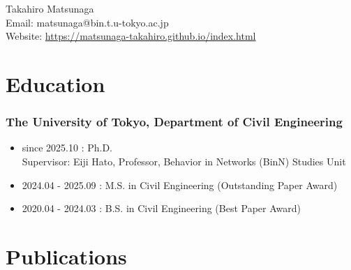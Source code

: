 \documentclass[uplatex,a4paper,10pt,dvipdfmx]{jsarticle}
\begin{document}
\begin{center}
  {\LARGE Takahiro Matsunaga}\\[2mm] %
  \small Email: {matsunaga@bin.t.u-tokyo.ac.jp} \\ Website: \url{https://matsunaga-takahiro.github.io/index.html}
\end{center}

\section*{Education}
\subsubsection*{The University of Tokyo, Department of Civil Engineering}
\begin{itemize}
  \item since 2025.10 : Ph.D. \\
        Supervisor: Eiji Hato, Professor, Behavior in Networks (BinN) Studies Unit
  \item 2024.04 - 2025.09 : M.S. in Civil Engineering (Outstanding Paper Award)
  \item 2020.04 - 2024.03 : B.S. in Civil Engineering (Best Paper Award)

\end{itemize}


\section*{Publications}

\nocite{*}



\end{document}
